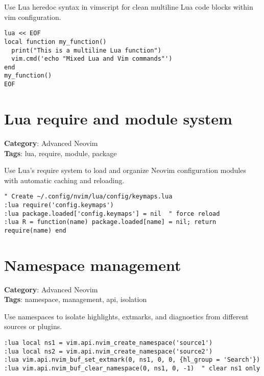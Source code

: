 Use Lua heredoc syntax in vimscript for clean multiline Lua code blocks within vim configuration.

\begin{Exa*}{}
\begin{Verbatim}[fontsize=\footnotesize, breaklines, breakanywhere]
lua << EOF
local function my_function()
  print("This is a multiline Lua function")
  vim.cmd('echo "Mixed Lua and Vim commands"')
end
my_function()
EOF
\end{Verbatim}
\end{Exa*}

\section{Lua require and module system}

\textbf{Category}: Advanced Neovim\\ \textbf{Tags}: lua, require, module, package
\vspace{0.5cm}

Use Lua's require system to load and organize Neovim configuration modules with automatic caching and reloading.

\begin{Exa*}{}
\begin{Verbatim}[fontsize=\footnotesize, breaklines, breakanywhere]
" Create ~/.config/nvim/lua/config/keymaps.lua
:lua require('config.keymaps')
:lua package.loaded['config.keymaps'] = nil  " force reload
:lua R = function(name) package.loaded[name] = nil; return require(name) end
\end{Verbatim}
\end{Exa*}

\section{Namespace management}

\textbf{Category}: Advanced Neovim\\ \textbf{Tags}: namespace, management, api, isolation
\vspace{0.5cm}

Use namespaces to isolate highlights, extmarks, and diagnostics from different sources or plugins.

\begin{Exa*}{}
\begin{Verbatim}[fontsize=\footnotesize, breaklines, breakanywhere]
:lua local ns1 = vim.api.nvim_create_namespace('source1')
:lua local ns2 = vim.api.nvim_create_namespace('source2')
:lua vim.api.nvim_buf_set_extmark(0, ns1, 0, 0, {hl_group = 'Search'})
:lua vim.api.nvim_buf_clear_namespace(0, ns1, 0, -1)  " clear ns1 only
\end{Verbatim}
\end{Exa*}

